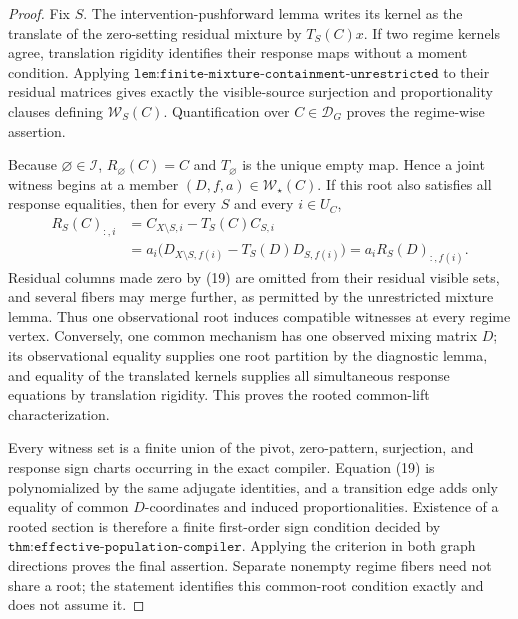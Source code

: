 \documentclass{article}
\begin{document}
\begin{proof}
Fix \(S\). The intervention-pushforward lemma writes its kernel as the translate of the zero-setting residual mixture by \(T_S(C)x\). If two regime kernels agree, translation rigidity identifies their response maps without a moment condition. Applying \(\texttt{lem:finite-mixture-containment-unrestricted}\) to their residual matrices gives exactly the visible-source surjection and proportionality clauses defining \(\mathcal W_S(C)\). Quantification over \(C\in\mathcal D_G\) proves the regime-wise assertion.

Because \(\varnothing\in\mathcal I\), \(R_\varnothing(C)=C\) and \(T_\varnothing\) is the unique empty map. Hence a joint witness begins at a member \((D,f,a)\in\mathcal W_\star(C)\). If this root also satisfies all response equalities, then for every \(S\) and every \(i\in U_C\),
\[
\begin{aligned}
R_S(C)_{:,i}
&=C_{X\setminus S,i}-T_S(C)C_{S,i}\\
&=a_i\bigl(D_{X\setminus S,f(i)}-T_S(D)D_{S,f(i)}\bigr)
=a_iR_S(D)_{:,f(i)}.
\end{aligned}\tag{19}
\]
Residual columns made zero by (19) are omitted from their residual visible sets, and several fibers may merge further, as permitted by the unrestricted mixture lemma. Thus one observational root induces compatible witnesses at every regime vertex. Conversely, one common mechanism has one observed mixing matrix \(D\); its observational equality supplies one root partition by the diagnostic lemma, and equality of the translated kernels supplies all simultaneous response equations by translation rigidity. This proves the rooted common-lift characterization.

Every witness set is a finite union of the pivot, zero-pattern, surjection, and response sign charts occurring in the exact compiler. Equation (19) is polynomialized by the same adjugate identities, and a transition edge adds only equality of common \(D\)-coordinates and induced proportionalities. Existence of a rooted section is therefore a finite first-order sign condition decided by \(\texttt{thm:effective-population-compiler}\). Applying the criterion in both graph directions proves the final assertion. Separate nonempty regime fibers need not share a root; the statement identifies this common-root condition exactly and does not assume it.
\end{proof}
\end{document}

